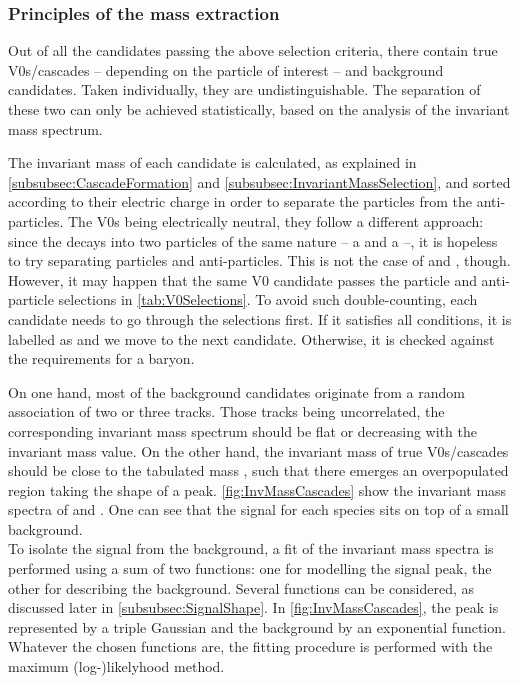 \subsubsection{Principles of the mass extraction}
\label{subsubsec:PrinciplesOfMassExtraction}

Out of all the candidates passing the above selection criteria, there contain true V0s/cascades -- depending on the particle of interest -- and background candidates. Taken individually, they are undistinguishable. The separation of these two can only be achieved statistically, based on the analysis of the invariant mass spectrum.

The invariant mass of each candidate is calculated, as explained in \Sec\ref{subsubsec:CascadeFormation} and \Sec\ref{subsubsec:InvariantMassSelection}, and sorted according to their electric charge in order to separate the particles from the anti-particles. The V0s being electrically neutral, they follow a different approach: since the \rmKzeroS decays into two particles of the same nature -- a \rmPiPlus and a \rmPiMinus --, it is hopeless to try separating particles and anti-particles. This is not the case of \rmLambda and \rmAlambda, though. However, it may happen that the same V0 candidate passes the particle and anti-particle selections in \tab\ref{tab:V0Selections}. To avoid such double-counting, each candidate needs to go through the \rmLambda selections first. If it satisfies all conditions, it is labelled as \rmLambda and we move to the next candidate. Otherwise, it is checked against the requirements for a \rmAlambda baryon.

On one hand, most of the background candidates originate from a random association of two or three tracks. Those tracks being uncorrelated, the corresponding invariant mass spectrum should be flat or decreasing with the invariant mass value. On the other hand, the invariant mass of true V0s/cascades should be close to the tabulated mass \mPDG, such that there emerges an overpopulated region taking the shape of a peak. \Figs\ref{fig:InvMassCascades} show the invariant mass spectra of \rmXi and \rmOmega.  One can see that the signal for each species sits on top of a small background.\\

To isolate the signal from the background, a fit of the invariant mass spectra is performed using a sum of two functions: one for modelling the signal peak, the other for describing the background. Several functions can be considered, as discussed later in \Sec\ref{subsubsec:SignalShape}. In \figs\ref{fig:InvMassCascades}, the peak is represented by a triple Gaussian and the background by an exponential function. Whatever the chosen functions are, the fitting procedure is performed with the maximum (log-)likelyhood method.

